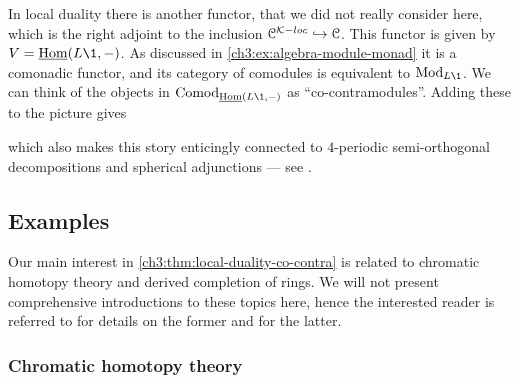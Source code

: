 \begin{remark}
    In local duality there is another functor, that we did not really consider here, which is the right adjoint to the inclusion $\EuScript{C}^{\mathcal{K}-loc}\hookrightarrow \EuScript{C}$. This functor is given by $V = \iHom(L\1, -)$. As discussed in \cref{ch3:ex:algebra-module-monad} it is a comonadic functor, and its category of comodules is equivalent to $\Mod_{L\1}$. We can think of the objects in $\Comod_{\iHom(L\1,-)}$ as ``co-contramodules''. Adding these to the picture gives 
    \begin{center}
    \end{center}
    which also makes this story enticingly connected to $4$-periodic semi-orthogonal decompositions and spherical adjunctions --- see \cite[Section 2.5]{dyckerhoff-kaparanov-schechtman-soibelman_2024}. 
\end{remark}



\subsection{Examples}

Our main interest in \cref{ch3:thm:local-duality-co-contra} is related to chromatic homotopy theory and derived completion of rings. We will not present comprehensive introductions to these topics here, hence the interested reader is referred to \cite{barthel-beaudry_19} for details on the former and \cite{barthel-heard-valenzuela_2020} for the latter.

\subsubsection*{Chromatic homotopy theory}

